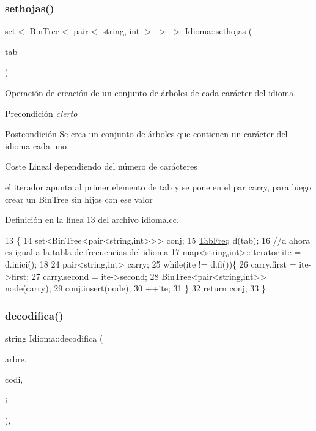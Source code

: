 \subsubsection{\texorpdfstring{sethojas()}{sethojas()}}
{\footnotesize\ttfamily set$<$ Bin\+Tree$<$ pair$<$ string, int $>$ $>$ $>$ Idioma\+::sethojas (\begin{DoxyParamCaption}\item[{\hyperlink{class_tab_freq}{Tab\+Freq} \&}]{tab }\end{DoxyParamCaption})\hspace{0.3cm}{\ttfamily [private]}}



Operación de creación de un conjunto de árboles de cada carácter del idioma. 

\begin{DoxyPrecond}{Precondición}
{\itshape cierto} 
\end{DoxyPrecond}
\begin{DoxyPostcond}{Postcondición}
Se crea un conjunto de árboles que contienen un carácter del idioma cada uno 
\end{DoxyPostcond}
\begin{DoxyParagraph}{Coste}
Lineal dependiendo del número de carácteres 
\end{DoxyParagraph}
el iterador apunta al primer elemento de tab y se pone en el par carry, para luego crear un Bin\+Tree sin hijos con ese valor

Definición en la línea 13 del archivo idioma.\+cc.


\begin{DoxyCode}
13                                                            \{
14   set<BinTree<pair<string,int>>> conj;
15   \hyperlink{class_tab_freq}{TabFreq} d(tab);
16   \textcolor{comment}{//d ahora es igual a la tabla de frecuencias del idioma}
17   map<string,int>::iterator ite = d.inici();
18 
24     pair<string,int> carry;
25     \textcolor{keywordflow}{while}(ite != d.fi())\{
26       carry.first = ite->first;
27       carry.second = ite->second;
28       BinTree<pair<string,int>> node(carry);
29       conj.insert(node);
30       ++ite;
31     \}
32     \textcolor{keywordflow}{return} conj;
33 \}
\end{DoxyCode}
\mbox{\label{class_idioma_a225fb55a6732d07e61bf310f5f29aa0e}} 
\subsubsection{\texorpdfstring{decodifica()}{decodifica()}}
{\footnotesize\ttfamily string Idioma\+::decodifica (\begin{DoxyParamCaption}\item[{const Bin\+Tree$<$ pair$<$ string, int $>$$>$ \&}]{arbre,  }\item[{string \&}]{codi,  }\item[{int \&}]{i }\end{DoxyParamCaption})\hspace{0.3cm}{\ttfamily [static]}, {\ttfamily [private]}}



